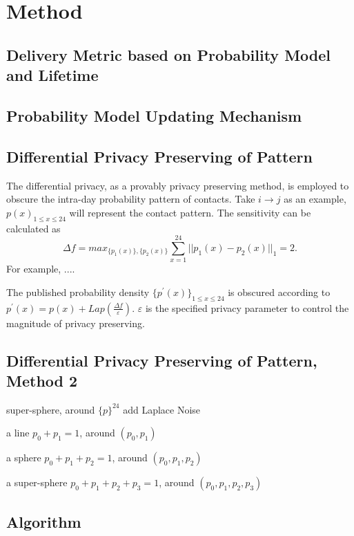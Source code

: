 \section{Method}
\label{sec:method}
\subsection{Delivery Metric based on Probability Model and Lifetime}

\subsection{Probability Model Updating Mechanism}

\subsection{Differential Privacy Preserving of Pattern}
The differential privacy, as a provably privacy preserving method,
is employed to obscure the intra-day probability pattern of contacts.
Take $i \rightarrow j$ as an example,
${p(x)}_{1 \le x \le 24}$ will represent the contact pattern.
The sensitivity can be calculated as
\begin{equation}
\nonumber
\Delta f = max_{\{p_{1}(x)\},\{p_{2}(x)\}} \sum_{x=1}^{24} || p_{1}(x) - p_{2}(x) ||_{1} = 2.
\end{equation}
For example, ....

The published probability density $\{p^{\prime}(x)\}_{1 \le x \le 24}$ is obscured
according to $p^{\prime}(x) = p(x) + Lap(\frac{\Delta f}{\varepsilon})$.
$\varepsilon$ is the specified privacy parameter to control the magnitude of privacy preserving.

\subsection{Differential Privacy Preserving of Pattern, Method 2}
super-sphere, around $\{p\}^{24}$ add Laplace Noise

a line $p_0 + p_1 = 1$, around $(p_0, p_1)$

a sphere $p_0 + p_1 + p_2 = 1$, around $(p_0, p_1, p_2)$

a super-sphere $p_0 + p_1 + p_2 + p_3 = 1$, around $(p_0, p_1, p_2, p_3)$
\subsection{Algorithm}

